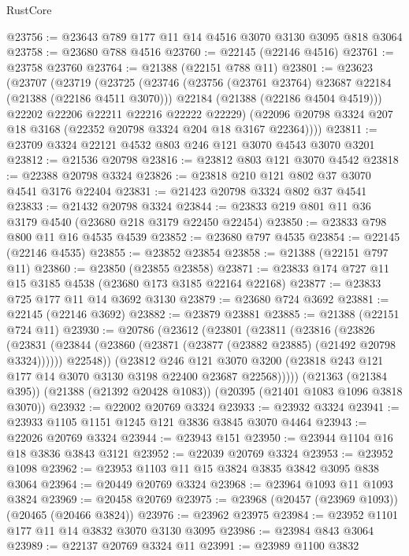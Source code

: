 \begin{lexlean}{RustCore}
\begin{coremodule}
@23756 := @23643 @789 @177 @11 @14 @4516 @3070 @3130 @3095 @818 @3064
@23758 := @23680 @788 @4516
@23760 := @22145 (@22146 @4516)
@23761 := @23758 @23760
@23764 := @21388 (@22151 @788 @11)
@23801 := @23623
    (@23707
      (@23719
        (@23725
          (@23746
            (@23756 (@23761 @23764) @23687 @22184 (@21388 (@22186 @4511 @3070)))
            @22184
            (@21388 (@22186 @4504 @4519)))
          @22202
          @22206
          @22211
          @22216
          @22222
          @22229)
        (@22096 @20798 @3324 @207 @18 @3168 (@22352 @20798 @3324 @204 @18 @3167 @22364))))
@23811 := @23709 @3324 @22121 @4532 @803 @246 @121 @3070 @4543 @3070 @3201
@23812 := @21536 @20798
@23816 := @23812 @803 @121 @3070 @4542
@23818 := @22388 @20798 @3324
@23826 := @23818 @210 @121 @802 @37 @3070 @4541 @3176 @22404
@23831 := @21423 @20798 @3324 @802 @37 @4541
@23833 := @21432 @20798 @3324
@23844 := @23833 @219 @801 @11 @36 @3179 @4540 (@23680 @218 @3179 @22450 @22454)
@23850 := @23833 @798 @800 @11 @16 @4535 @4539
@23852 := @23680 @797 @4535
@23854 := @22145 (@22146 @4535)
@23855 := @23852 @23854
@23858 := @21388 (@22151 @797 @11)
@23860 := @23850 (@23855 @23858)
@23871 := @23833 @174 @727 @11 @15 @3185 @4538 (@23680 @173 @3185 @22164 @22168)
@23877 := @23833 @725 @177 @11 @14 @3692 @3130
@23879 := @23680 @724 @3692
@23881 := @22145 (@22146 @3692)
@23882 := @23879 @23881
@23885 := @21388 (@22151 @724 @11)
@23930 := @20786
    (@23612
      (@23801
        (@23811
          (@23816
            (@23826
              (@23831 (@23844 (@23860 (@23871 (@23877 (@23882 @23885) (@21492 @20798 @3324))))))
              @22548))
          (@23812
            @246
            @121
            @3070
            @3200
            (@23818 @243 @121 @177 @14 @3070 @3130 @3198 @22400 @23687 @22568)))))
    (@21363 (@21384 @395))
    (@21388 (@21392 @20428 @1083))
    (@20395 (@21401 @1083 @1096 @3818 @3070))
@23932 := @22002 @20769 @3324
@23933 := @23932 @3324
@23941 := @23933 @1105 @1151 @1245 @121 @3836 @3845 @3070 @4464
@23943 := @22026 @20769 @3324
@23944 := @23943 @151
@23950 := @23944 @1104 @16 @18 @3836 @3843 @3121
@23952 := @22039 @20769 @3324
@23953 := @23952 @1098
@23962 := @23953 @1103 @11 @15 @3824 @3835 @3842 @3095 @838 @3064
@23964 := @20449 @20769 @3324
@23968 := @23964 @1093 @11 @1093 @3824
@23969 := @20458 @20769
@23975 := @23968 (@20457 (@23969 @1093)) (@20465 (@20466 @3824))
@23976 := @23962 @23975
@23984 := @23952 @1101 @177 @11 @14 @3832 @3070 @3130 @3095
@23986 := @23984 @843 @3064
@23989 := @22137 @20769 @3324 @11
@23991 := @23989 @1100 @3832

\end{coremodule}
\end{lexlean}
